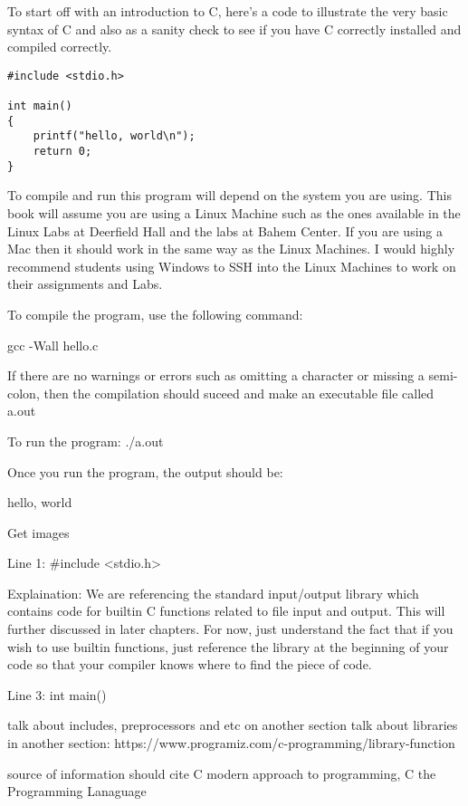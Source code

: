 \documentclass{article}
\begin{document}
To start off with an introduction to C, here's a code to illustrate the very basic syntax of C and also as a sanity check to see if you have C correctly installed and compiled correctly. 

\begin{lstlisting}
#include <stdio.h>

int main()
{
	printf("hello, world\n");
    return 0;
}
\end{lstlisting}



To compile and run this program will depend on the system you are using. This book will assume you are using a Linux Machine such as the ones available in the Linux Labs at Deerfield Hall and the labs at Bahem Center. If you are using a Mac then it should work in the same way as the Linux Machines. I would highly recommend students using Windows to SSH into the Linux Machines to work on their assignments and Labs. 

To compile the program, use the following command: 

gcc -Wall hello.c


If there are no warnings or errors such as omitting a character or missing a semi-colon, then the compilation should suceed and make an executable file called a.out

To run the program: ./a.out

Once you run the program, the output should be:

hello, world

{Get images}


Line 1: #include <stdio.h>

Explaination: We are referencing the standard input/output library which contains code for builtin C functions related to file input and output. This will further discussed in later chapters. For now, just understand the fact that if you wish to use builtin functions, just reference the library at the beginning of your code so that your compiler knows where to find the piece of code.

Line 3: int main()







{talk about includes, preprocessors and etc on another section}
{talk about libraries in another section: https://www.programiz.com/c-programming/library-function}

{source of information should cite C modern approach to programming, C the Programming Lanaguage}
\end{document}
